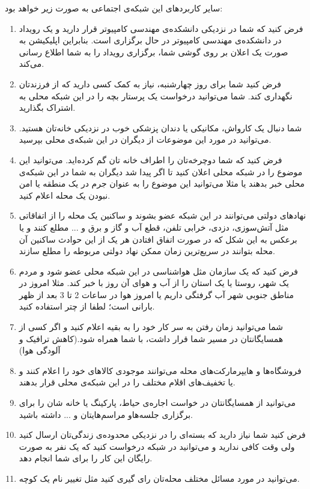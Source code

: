 سایر کاربرد‌های این شبکه‌ی اجتماعی به صورت زیر خواهد بود:

\begin{enumerate}
	\item 
	فرض کنید که شما در نزدیکی دانشکده‌ی مهندسی کامپیوتر قرار دارید و یک رویداد در دانشکده‌ی مهندسی کامپیوتر در حال برگزاری است. بنابراین اپلیکیشن به صورت یک اعلان بر روی گوشی شما، برگزاری رویداد را به شما اطلاع رسانی می‌کند.
	\item 
	فرض کنید شما برای روز چهارشنبه، نیاز به کمک کسی دارید که از فرزندتان نگهداری کند. شما می‌توانید درخواست یک پرستار بچه را در این شبکه محلی به اشتراک بگذارید.
	
	\item 
	شما دنبال یک کارواش، مکانیکی یا دندان پزشکی خوب در نزدیکی خانه‌تان هستید. می‌توانید در مورد این موضوعات از دیگران در این شبکه‌ی محلی بپرسید.
	\item 
	فرض کنید که شما دوچرخه‌تان را اطراف خانه تان گم کرده‌اید. می‌توانید این موضوع را در شبکه محلی اعلان کنید تا اگر پیدا شد دیگران به شما در این شبکه‌ی محلی خبر بدهند یا مثلا می‌توانید این موضوع را به عنوان جرم در یک منطقه یا امن نبودن یک محله اعلام کنید.
	
	\item 
	نهاد‌های دولتی می‌توانند در این شبکه عضو بشوند و ساکنین یک محله را از اتفاقاتی مثل آتش‌سوزی، دزدی، خرابی تلفن، قطع آب و گاز و برق و ... مطلع کنند و یا برعکس به این شکل که در صورت اتفاق افتادن هر یک از این حوادث ساکنین آن محله بتوانند در سریع‌ترین زمان ممکن نهاد دولتی مربوطه را مطلع سازند.
	
	\item 
	فرض کنید که یک سازمان مثل هواشناسی در این شبکه محلی عضو شود و مردم یک شهر، روستا یا یک استان را از آب و هوای آن روز با خبر کند. مثلا امروز در مناطق جنوبی شهر آب گرفتگی داریم یا امروز هوا در ساعات  2 تا 3 بعد از ظهر بارانی است؛ لطفا از چتر استفاده کنید.
	
	\item
	شما می‌توانید زمان رفتن به سر کار خود را به بقیه اعلام کنید و اگر کسی از همسایگانتان در مسیر شما قرار داشت، با شما همراه شود.(کاهش ترافیک و آلودگی هوا)
	\item 
	فروشگاه‌ها و هایپرمارکت‌های محله می‌توانند موجودی کالا‌های خود را اعلام کنند و یا تخفیف‌های اقلام مختلف را در این شبکه‌ی محلی قرار بدهند.
	\item 
	می‌توانید از همسایگانتان در خواست اجاره‌ی حیاط، پارکینگ یا خانه شان را برای برگزاری جلسه‌هاو مراسم‌هایتان و ... داشته باشید.
	\item 
	فرض کنید شما نیاز دارید که بسته‌ای را در نزدیکی محدوده‌ی زندگی‌تان ارسال کنید ولی وقت کافی ندارید و می‌توانید در شبکه درخواست کنید که یک نفر به صورت رایگان این کار را برای شما انجام دهد.
	\item 
	می‌توانید در مورد مسائل مختلف محله‌تان رای گیری کنید مثل تغییر نام یک کوچه.
	 
\end{enumerate}
 
